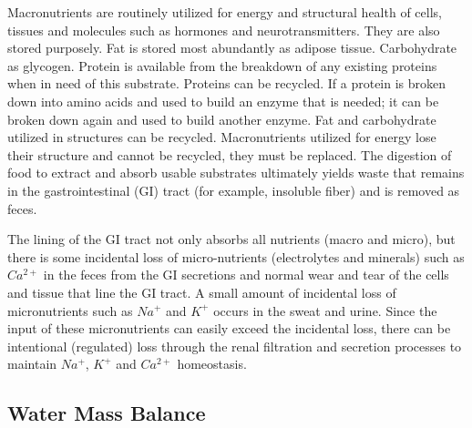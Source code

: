 Macronutrients are routinely utilized for energy and structural health of cells, tissues and molecules such as hormones and neurotransmitters. They are also stored purposely. Fat is stored most abundantly as adipose tissue. Carbohydrate as glycogen. Protein is available from the breakdown of any existing proteins when in need of this substrate. Proteins can be recycled. If a protein is broken down into amino acids and used to build an enzyme that is needed; it can be broken down again and used to build another enzyme. Fat and carbohydrate utilized in structures can be recycled. Macronutrients utilized for energy lose their structure and cannot be recycled, they must be replaced. The digestion of food to extract and absorb usable substrates ultimately yields waste that remains in the gastrointestinal (GI) tract (for example, insoluble fiber) and is removed as feces. 

The lining of the GI tract not only absorbs all nutrients (macro and micro), but there is some incidental loss of micro-nutrients (electrolytes and minerals) such as $Ca^{2+}$ in the feces from the GI secretions and normal wear and tear of the cells and tissue that line the GI tract. A small amount of incidental loss of micronutrients such as $Na^+$ and $K^+$ occurs in the sweat and urine. Since the input of these micronutrients can easily exceed the incidental loss, there can be intentional (regulated) loss through the renal filtration and secretion processes to maintain $Na^+$, $K^+$ and $Ca^{2+}$ homeostasis.


\subsection{Water Mass Balance}

